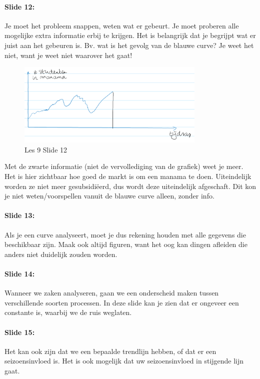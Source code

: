\documentclass[10pt,a4paper]{report}
\begin{document}
\paragraph{Slide 12:} Je moet het probleem snappen, weten wat er gebeurt. Je moet proberen alle mogelijke extra informatie erbij te krijgen. Het is belangrijk dat je begrijpt wat er juist aan het gebeuren is. Bv. wat is het gevolg van de blauwe curve? Je weet het niet, want je weet niet waarover het gaat!

\begin{figure}[h!]
\centering
\includegraphics[width=90mm]{Les09_06.png}
\caption{Les 9 Slide 12} 
\label{les09_06}
\end{figure}

Met de zwarte informatie (niet de vervollediging van de grafiek) weet je meer. Het is hier zichtbaar hoe goed de markt is om een manama te doen. Uiteindelijk worden ze niet meer gesubsidi\"eerd, dus wordt deze uiteindelijk afgeschaft. Dit kon je niet weten/voorspellen vanuit de blauwe curve alleen, zonder info.

\paragraph{Slide 13:} Als je een curve analyseert, moet je dus rekening houden met alle gegevens die beschikbaar zijn. Maak ook altijd figuren, want het oog kan dingen afleiden die anders niet duidelijk zouden worden.

\paragraph{Slide 14:} Wanneer we zaken analyseren, gaan we een onderscheid maken tussen verschillende soorten processen. In deze slide kan je zien dat er ongeveer een constante is, waarbij we de ruis weglaten. 

\paragraph{Slide 15:} Het kan ook zijn dat we een bepaalde trendlijn hebben, of dat er een seizoensinvloed is. Het is ook mogelijk dat uw seizoensinvloed in stijgende lijn gaat. 
\end{document}
